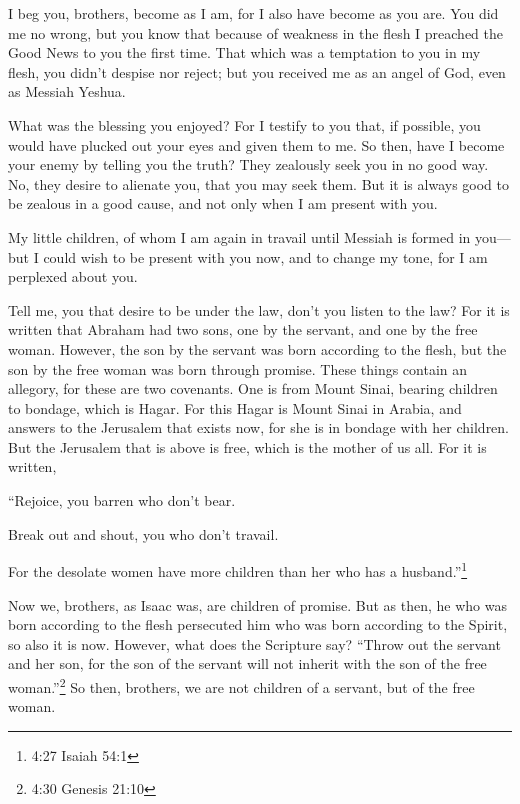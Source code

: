 \myverse{}I beg you, brothers, become as I am, for I also have become as
you are. You did me no wrong,
\myverse{}but you know that because of weakness in the flesh I preached the Good News
to you the first time.
\myverse{}That which was a temptation to you in my flesh, you didn’t despise nor reject;
but you received me as an angel of God, even as Messiah Yeshua.

\myverse{}What was the blessing you enjoyed? For I testify to you that,
if possible, you would have plucked out your eyes and given them to me.
\myverse{}So then, have I become your enemy by telling you the truth?
\myverse{}They zealously seek you in no good way. No, they desire to alienate you, that
you may seek them.
\myverse{}But it is always good to be zealous in a good cause, and not only when I am
present with you.

\myverse{}My little children, of whom I am again in travail until Messiah
is formed in you—
\myverse{}but I could wish to be present with you now, and to change my tone, for I
am perplexed about you.

\myverse{}Tell me, you that desire to be under the law, don’t you listen
to the law?
\myverse{}For it is written that Abraham had two sons, one by the servant, and one by
the free woman.
\myverse{}However, the son by the servant was born according to the flesh, but the son
by the free woman was born through promise.
\myverse{}These things contain an allegory, for these are two covenants. One is from
Mount Sinai, bearing children to bondage, which is Hagar.
\myverse{}For this Hagar is Mount Sinai in Arabia, and answers to the Jerusalem that
exists now, for she is in bondage with her children.
\myverse{}But the Jerusalem that is above is free, which is the mother of us all.
\myverse{}For it is written,

“Rejoice, you barren who don’t bear.

Break out and shout, you who don’t travail.

For the desolate women have more children than her who has a husband.”\footnote{4:27 Isaiah 54:1}

\myverse{}Now we, brothers, as Isaac was, are children of promise.
\myverse{}But as then, he who was born according to the flesh persecuted him who was
born according to the Spirit, so also it is now.
\myverse{}However, what does the Scripture say? “Throw out the servant and her son,
for the son of the servant will not inherit with the son of the free woman.”\footnote{4:30 Genesis 21:10}
\myverse{}So then, brothers, we are not children of a servant, but of the free woman.


